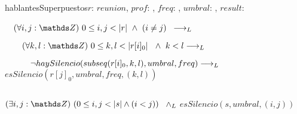 
\begin{proc}{hablantesSuperpuestos}{\In $r$: $reunion$,
    \In $prof$: \ent,
    \In $freq$: \ent,
    \In $umbral$: \ent,
    \Out $result$: \bool}{}
\end{proc}

{

    $\quad\paraTodo{i,j}{0}{\longitud{r}\ \wedge\ (i \neq j)}$
    $\longrightarrow _L$

        $\quad\quad\paraTodo{k,l}{0}{\longitud{r[i]_{0}}}\ \wedge\ k < l \implicaLuego$

        $\quad\quad\quad\neg haySilencio(subseq(r[i]_{0}, k, l),  umbral, freq) \longrightarrow _L$
        $esSilencio(r[j]_{0}, umbral, freq, (k, l))$
}

$ $

{
    $\existe{i,j}{(0}{\longitud{s} \wedge (i < j))}$
    $\land _L$
    $esSilencio(s, umbral, (i,j))$
}
